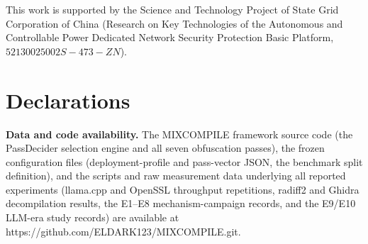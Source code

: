 \documentclass[pdflatex,sn-mathphys-num]{sn-jnl}
\theoremstyle{thmstyleone}%
\theoremstyle{thmstyletwo}%
\theoremstyle{thmstylethree}%
\begin{document}
\backmatter


This work is supported by the Science and Technology Project of State Grid Corporation of China (Research on Key Technologies of the Autonomous and Controllable Power Dedicated Network Security Protection Basic Platform, $52130025002S-473-ZN$).

\section*{Declarations}

\textbf{Data and code availability.} The MIXCOMPILE framework source code (the
PassDecider selection engine and all seven obfuscation passes), the frozen
configuration files (deployment-profile and pass-vector JSON, the benchmark split
definition), and the scripts and raw measurement data underlying all reported
experiments (llama.cpp and OpenSSL throughput repetitions, radiff2 and Ghidra
decompilation results, the E1--E8 mechanism-campaign records, and the E9/E10
LLM-era study records) are available at
https://github.com/ELDARK123/MIXCOMPILE.git.


\end{document}

